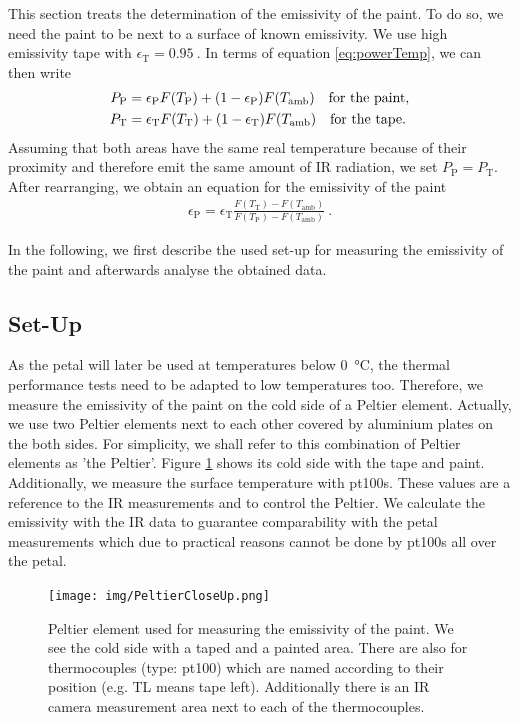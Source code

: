 This section treats the determination of the emissivity of the paint. To do so, we need the paint to be next to a surface of known emissivity. We use high emissivity tape with $\epsilon_\text{T} = \SI{0.95}{}$. In terms of equation \eqref{eq:powerTemp}, we can then write
\begin{align*}
	P_\text{P} &= \epsilon_\text{P}F(T_\text{P}) + (1-\epsilon_\text{P})F(T_\text{amb}) \text{\quad for the paint,} \\
	P_\text{T} &= \epsilon_\text{T}F(T_\text{T}) + (1-\epsilon_\text{T})F(T_\text{amb}) \text{\quad for the tape.}
\end{align*}
Assuming that both areas have the same real temperature because of their proximity and therefore emit the same amount of IR radiation, we set $P_\text{P}=P_\text{T}$. After rearranging, we obtain an equation for the emissivity of the paint
\begin{align}\label{eq:emissivity}
	\epsilon_\text{P} = \epsilon_\text{T}\frac{F(T_\text{T})-F(T_\text{amb})}{F(T_\text{P})-F(T_\text{amb})} \ .
\end{align}


In the following, we first describe the used set-up for measuring the emissivity of the paint and afterwards analyse the obtained data.
\subsection{Set-Up\label{sec:setup}}
As the petal will later be used at temperatures below \SI{0}{\degreeCelsius}, the thermal performance tests need to be adapted to low temperatures too. Therefore, we measure the emissivity of the paint on the cold side of a Peltier element. Actually, we use two Peltier elements next to each other covered by aluminium plates on the both sides. For simplicity, we shall refer to this combination of Peltier elements as 'the Peltier'. Figure \ref{fig:peltier} shows its cold side with the tape and paint. Additionally, we measure the surface temperature with pt100s. These values are a reference to the IR measurements and to control the Peltier. We calculate the emissivity with the IR data to guarantee comparability with the petal measurements which due to practical reasons cannot be done by pt100s all over the petal. \\


\begin{figure}[h!]
	\centering
	\texttt{[image: img/PeltierCloseUp.png]}
	\caption{Peltier element used for measuring the emissivity of the paint. We see the cold side with a taped and a painted area. There are also for thermocouples (type: pt100) which are named according to their position (e.g. TL means tape left). Additionally there is an IR camera measurement area next to each of the thermocouples.}
	\label{fig:peltier}
\end{figure}


